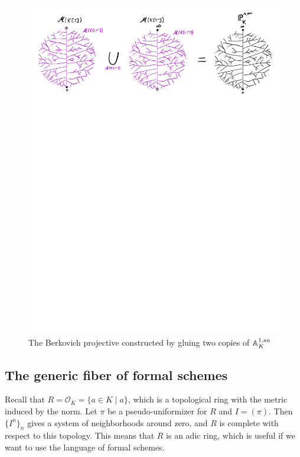 \begin{figure}[h]
	\centering
	\includegraphics[width=\textwidth]{figures/projective_line}
	\caption{The Berkovich projective constructed by gluing two copies of $\mathbb{A}^{1, \text{an}}_K$}
	\label{fig:berk_projective_line}
\end{figure}


\subsection{The generic fiber of formal schemes} \label{sec:the_generic_fiber_of_formal_schemes}

Recall that $R = \mathcal{O}_K = \{a \in K \mid a\} $, which is a topological ring with the metric induced by the norm. 
Let $\pi$ be a pseudo-uniformizer for $R$ and $I = (\pi)$. 
Then $\{I^{n}\}_n$ gives a system of neighborhoods around zero, and $R$ is complete with respect to this topology. 
This means that $R$ is an adic ring, which is useful if we want to use the language of formal schemes. 

